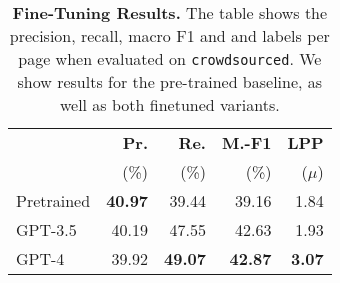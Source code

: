 \begin{table}[!ht]
\centering
\caption{\textbf{Fine-Tuning Results.} The table shows the precision, recall, macro F1 and and labels per page when evaluated on \texttt{crowdsourced}. We show results for the pre-trained baseline, as well as both finetuned variants.}
\label{tab:finetune-results}
\begin{tabular}{lrrrr}
\toprule
 & \textbf{Pr.} & \textbf{Re.} & \textbf{M.-F1} & \textbf{LPP} \\
 & (\%) & (\%) & (\%) & ($\mu$) \\
\midrule
Pretrained & \textbf{40.97} & 39.44 & 39.16 & 1.84 \\
GPT-3.5 & 40.19 & 47.55 & 42.63 & 1.93 \\
GPT-4 & 39.92 & \textbf{49.07} & \textbf{42.87} & \textbf{3.07} \\
\bottomrule
\end{tabular}
\end{table}

